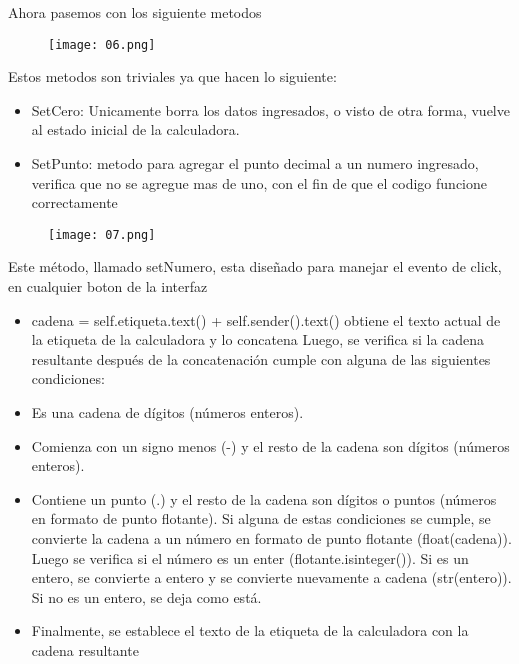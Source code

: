 \documentclass[11pt]{article}
\begin{document}
Ahora pasemos con los siguiente metodos

\begin{figure}[H]
		\begin{center}
 			\texttt{[image: 06.png]}
 			
		\end{center} 
\end{figure}

Estos metodos son triviales ya que hacen lo siguiente:
\begin{itemize}
\item SetCero: Unicamente borra los datos ingresados, o visto de otra forma, vuelve al estado inicial de la calculadora.
\item SetPunto: metodo para agregar el punto decimal a un numero ingresado, verifica que no se agregue mas de uno, con el fin de que el codigo funcione correctamente
\end{itemize}

\begin{figure}[H]
		\begin{center}
 			\texttt{[image: 07.png]}
 			
		\end{center} 
\end{figure}

Este método, llamado setNumero, esta diseñado para manejar el evento de click, en cualquier boton de la interfaz
\begin{itemize}
\item  cadena = self.etiqueta.text() + self.sender().text() obtiene el texto actual de la etiqueta de la calculadora y lo concatena
 Luego, se verifica si la cadena resultante después de la concatenación cumple con alguna de las siguientes condiciones:

\item Es una cadena de dígitos (números enteros).
\item Comienza con un signo menos (-) y el resto de la cadena son dígitos (números enteros).
\item Contiene un punto (.) y el resto de la cadena son dígitos o puntos (números en formato de punto flotante).
Si alguna de estas condiciones se cumple, se convierte la cadena a un número en formato de punto flotante (float(cadena)). Luego se verifica si el número es un enter (flotante.isinteger()). Si es un entero, se convierte a entero y se convierte nuevamente a cadena (str(entero)). Si no es un entero, se deja como está.

\item Finalmente, se establece el texto de la etiqueta de la calculadora con la cadena resultante
\end{itemize}
\end{document}
